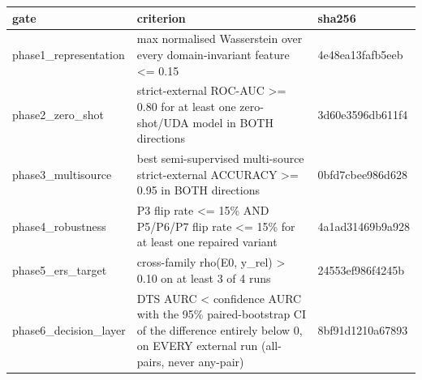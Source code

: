 \begin{tabular}{lll}
\toprule
gate & criterion & sha256 \\
\midrule
phase1\_representation & max normalised Wasserstein over every domain-invariant feature <= 0.15 & 4e48ea13fafb5eeb \\
phase2\_zero\_shot & strict-external ROC-AUC >= 0.80 for at least one zero-shot/UDA model in BOTH directions & 3d60e3596db611f4 \\
phase3\_multisource & best semi-supervised multi-source strict-external ACCURACY >= 0.95 in BOTH directions & 0bfd7cbee986d628 \\
phase4\_robustness & P3 flip rate <= 15\% AND P5/P6/P7 flip rate <= 15\% for at least one repaired variant & 4a1ad31469b9a928 \\
phase5\_ers\_target & cross-family rho(E0, y\_rel) > 0.10 on at least 3 of 4 runs & 24553ef986f4245b \\
phase6\_decision\_layer & DTS AURC < confidence AURC with the 95\% paired-bootstrap CI of the difference entirely below 0, on EVERY external run (all-pairs, never any-pair) & 8bf91d1210a67893 \\
\bottomrule
\end{tabular}
